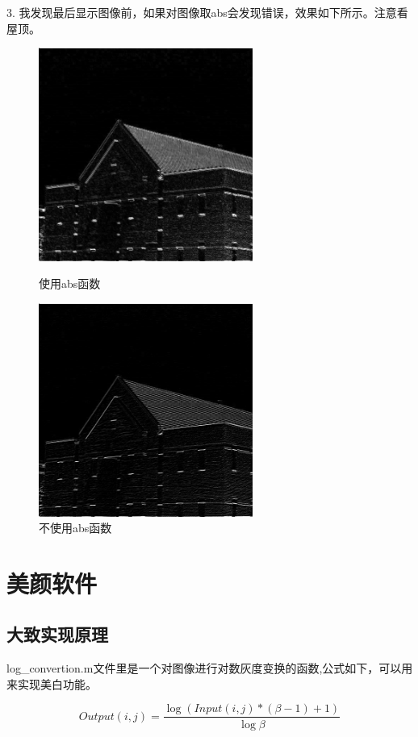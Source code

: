 \documentclass[11pt, a4paper, UTF8]{ctexart}
\begin{document}
    3. 我发现最后显示图像前，如果对图像取abs会发现错误，效果如下所示。注意看屋顶。\par 
    \begin{figure}[H]
      \centering
      \begin{minipage}[t]{0.48\textwidth}
      \centering
      \includegraphics[width=7cm]{sobel_abs.jpg}
      \caption{使用abs函数}
      \end{minipage}
      \begin{minipage}[t]{0.48\textwidth}
      \centering
      \includegraphics[width=7cm]{sobel_n_abs.jpg}
      \caption{不使用abs函数}
      \end{minipage}
    \end{figure}
    


    \section{美颜软件}

    \subsection{大致实现原理}
    log\_convertion.m文件里是一个对图像进行对数灰度变换的函数,公式如下，可以用来实现美白功能。\par 
    \begin{equation*}
        Output(i,j) = \frac{ \log{(Input(i,j) *(\beta-1) +1 )}}{\log{\beta}}
    \end{equation*}
\end{document}
